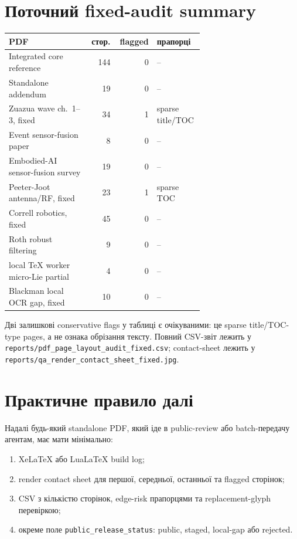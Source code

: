 \section{Поточний fixed-audit summary}

\begin{longtable}{L{0.42\linewidth}r r L{0.24\linewidth}}
\toprule
PDF & стор. & flagged & прапорці \\
\midrule
\endhead
Integrated core reference & 144 & 0 & -- \\
Standalone addendum & 19 & 0 & -- \\
Zuazua wave ch.~1--3, fixed & 34 & 1 & sparse title/TOC \\
Event sensor-fusion paper & 8 & 0 & -- \\
Embodied-AI sensor-fusion survey & 19 & 0 & -- \\
Peeter-Joot antenna/RF, fixed & 23 & 1 & sparse TOC \\
Correll robotics, fixed & 45 & 0 & -- \\
Roth robust filtering & 9 & 0 & -- \\
local TeX worker micro-Lie partial & 4 & 0 & -- \\
Blackman local OCR gap, fixed & 10 & 0 & -- \\
\bottomrule
\end{longtable}

Дві залишкові conservative flags у таблиці є очікуваними: це sparse title/TOC-type pages, а не ознака обрізання тексту. Повний CSV-звіт лежить у \texttt{reports/pdf\_page\_layout\_audit\_fixed.csv}; contact-sheet лежить у \texttt{reports/qa\_render\_contact\_sheet\_fixed.jpg}.

\section{Практичне правило далі}
Надалі будь-який standalone PDF, який іде в public-review або batch-передачу агентам, має мати мінімально:
\begin{enumerate}
\item XeLaTeX або LuaLaTeX build log;
\item render contact sheet для першої, середньої, останньої та flagged сторінок;
\item CSV з кількістю сторінок, edge-risk прапорцями та replacement-glyph перевіркою;
\item окреме поле \texttt{public\_release\_status}: public, staged, local-gap або rejected.
\end{enumerate}

